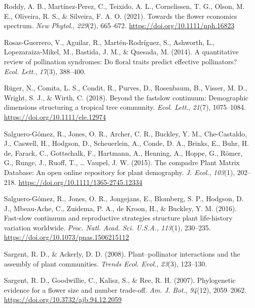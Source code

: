 \documentclass[
  12pt,
  a4paper,
]{article}
\newlength{\cslhangindent}
\newlength{\cslentryspacingunit} %
\newenvironment{CSLReferences}[2] %
 {%
  \setlength{\parindent}{0pt}
  \ifodd #1
  \let\oldpar\par
  \def\par{\hangindent=\cslhangindent\oldpar}
  \fi
  \setlength{\parskip}{#2\cslentryspacingunit}
 }%
 {}
\begin{document}
\begin{CSLReferences}{1}{0}
\leavevmode{}%
Roddy, A. B., Martínez-Perez, C., Teixido, A. L., Cornelissen, T. G., Olson, M. E., Oliveira, R. S., \& Silveira, F. A. O. (2021). Towards the flower economics spectrum. \emph{New Phytol.}, \emph{229}(2), 665--672. \url{https://doi.org/10.1111/nph.16823}

\leavevmode{}%
Rosas-Guerrero, V., Aguilar, R., Martén-Rodríguez, S., Ashworth, L., Lopezaraiza-Mikel, M., Bastida, J. M., \& Quesada, M. (2014). A quantitative review of pollination syndromes: Do floral traits predict effective pollinators? \emph{Ecol. Lett.}, \emph{17}(3), 388--400.

\leavevmode{}%
Rüger, N., Comita, L. S., Condit, R., Purves, D., Rosenbaum, B., Visser, M. D., Wright, S. J., \& Wirth, C. (2018). Beyond the fast\textendash slow continuum: Demographic dimensions structuring a tropical tree community. \emph{Ecol. Lett.}, \emph{21}(7), 1075--1084. \url{https://doi.org/10.1111/ele.12974}

\leavevmode{}%
Salguero-Gómez, R., Jones, O. R., Archer, C. R., Buckley, Y. M., Che-Castaldo, J., Caswell, H., Hodgson, D., Scheuerlein, A., Conde, D. A., Brinks, E., Buhr, H. de, Farack, C., Gottschalk, F., Hartmann, A., Henning, A., Hoppe, G., Römer, G., Runge, J., Ruoff, T., \ldots{} Vaupel, J. W. (2015). The compadre {Plant Matrix Database}: An open online repository for plant demography. \emph{J. Ecol.}, \emph{103}(1), 202--218. \url{https://doi.org/10.1111/1365-2745.12334}

\leavevmode{}%
Salguero-Gómez, R., Jones, O. R., Jongejans, E., Blomberg, S. P., Hodgson, D. J., Mbeau-Ache, C., Zuidema, P. A., de Kroon, H., \& Buckley, Y. M. (2016). Fast-slow continuum and reproductive strategies structure plant life-history variation worldwide. \emph{Proc. Natl. Acad. Sci. U.S.A.}, \emph{113}(1), 230--235. \url{https://doi.org/10.1073/pnas.1506215112}

\leavevmode{}%
Sargent, R. D., \& Ackerly, D. D. (2008). Plant--pollinator interactions and the assembly of plant communities. \emph{Trends Ecol. Evol.}, \emph{23}(3), 123--130.

\leavevmode{}%
Sargent, R. D., Goodwillie, C., Kalisz, S., \& Ree, R. H. (2007). Phylogenetic evidence for a flower size and number trade-off. \emph{Am. J. Bot.}, \emph{94}(12), 2059--2062. \url{https://doi.org/10.3732/ajb.94.12.2059}


\end{CSLReferences}
\end{document}
